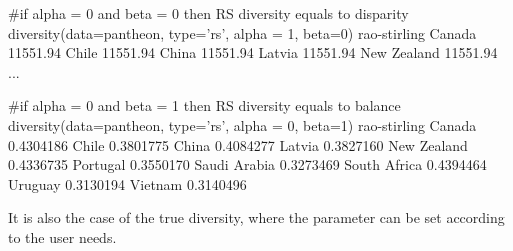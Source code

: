 \begin{example}
  #if alpha = 0 and beta = 0 then RS diversity equals to disparity
  diversity(data=pantheon, type='rs', alpha = 1, beta=0)
               rao-stirling
Canada           11551.94
Chile            11551.94
China            11551.94
Latvia           11551.94
New Zealand      11551.94
...

  #if alpha = 0 and beta = 1 then RS diversity equals to balance
  diversity(data=pantheon, type='rs', alpha = 0, beta=1)
rao-stirling
Canada          0.4304186
Chile           0.3801775
China           0.4084277
Latvia          0.3827160
New Zealand     0.4336735
Portugal        0.3550170
Saudi Arabia    0.3273469
South Africa    0.4394464
Uruguay         0.3130194
Vietnam         0.3140496
\end{example}

It is also the case of the true diversity, where the parameter  can be set according to the user needs.






\address{Miguel R. Guevara\\
  Universidad de Playa Ancha and Universidad Federico Santa María\\
  Valparaíso\\
  Chile\\}

\address{Dominik Hartmann\\
  Chair for Economics of Innovation, University of Hohenheim\\
  Wollgrasweg 23, 70599, Stuttgart\\
  Germany\\}

\address{Marcelo Mendoza\\
  Universidad Federico Santa María\\
  Av. Vicuna Mackenna 3939, San Joaquin, Santiago\\
  Chile\\}


